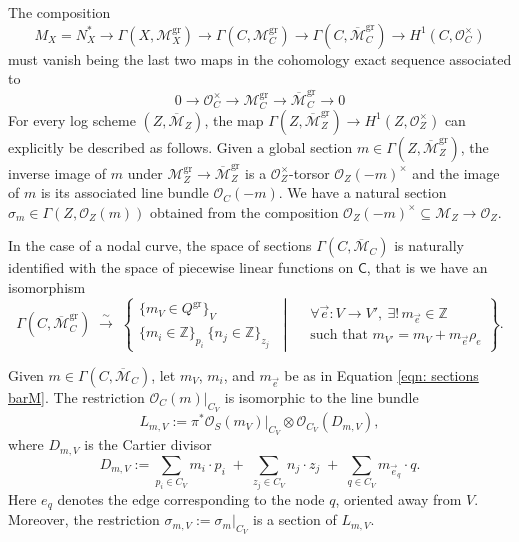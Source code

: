 \documentclass{article}
\def\cM{{\overline{\mathcal{M}}}}
\def\cO{\mathcal{O}}
\def\oM{\overline{\mathcal{M}}}
\def\cM{{\mathcal{M}}}
\newcommand{\gr}{\mathrm{gr}}
\begin{document}
The composition 
\begin{equation}\label{eqn: map M to Pic}
M_X= N_X^* \to \Gamma(X, \mathcal{M}^{\gr}_X) \to \Gamma(C, \cM^{\gr}_{C}) \to \Gamma(C, \oM^{\gr}_{C}) \to H^1(C, \cO_C^{\times})
\end{equation}
must vanish being the last two maps in the cohomology exact sequence associated to 
$$
0 \to \cO_C^{\times} \to \cM^{\gr}_C \to \oM^{\gr}_C \to 0
$$
For every log scheme $(Z,\oM_Z)$, the map $\Gamma(Z, \oM^{\gr}_{Z}) \to H^1(Z, \cO_Z^{\times})$ can explicitly be described as follows. Given a global section $m \in \Gamma(Z, \oM^{\gr}_{Z}) $, the inverse image of $m$ under $\cM^{\gr}_Z \to \oM^{\gr}_Z$ is a $\cO_Z^{\times}$-torsor $\cO_Z(-m)^{\times}$ and the image of $m$ is its associated line bundle $\cO_C(-m)$. We have a natural section $\sigma_m \in \Gamma(Z,\cO_Z(m))$ obtained from the composition $\cO_Z(-m)^{\times} \subseteq \cM_Z \to \cO_Z$.

In the case of a nodal curve, the space of sections $\Gamma(C,\oM_C)$ is naturally identified with the space of piecewise linear functions on $\mathsf{C}$, that is we have an isomorphism
\begin{equation}\label{eqn: sections barM}
\Gamma(C, \oM_C^{\gr})
\;\xrightarrow{\sim}\;
\left\{
\begin{array}{c}
\{m_V \in Q^{\gr}\}_V \\
\{m_i \in \mathbb{Z}\}_{p_i} \ \{n_j \in \mathbb{Z}\}_{z_j}
\end{array}
\ \middle|\ 
\begin{aligned}
&\forall \vec{e}: V \to V',\ \exists!\, m_{\vec{e}} \in \mathbb{Z} \\
&\text{such that } m_{V'} = m_V + m_{\vec{e}} \rho_e
\end{aligned}
\right\}.
\end{equation}

Given $m \in \Gamma(C, \oM_C)$, let $m_V$, $m_i$, and $m_{\vec{e}}$ be as in Equation \eqref{eqn: sections barM}. The restriction $\mathcal{O}_C(m)|_{C_V}$ is isomorphic to the line bundle
\begin{equation}\label{eqn: line bdl LmV}
L_{m,V} := \pi^*\mathcal{O}_S(m_V)\big|_{C_V} \otimes \mathcal{O}_{C_V}(D_{m,V}),
\end{equation}
where $D_{m,V}$ is the Cartier divisor
\begin{equation}\label{eqn: divisor DmV}
D_{m,V} := \sum_{p_i \in C_V} m_i \cdot p_i \;+\; \sum_{z_j \in C_V} n_j \cdot z_j \;+\; \sum_{q \in C_V} m_{\vec{e}_q} \cdot q.
\end{equation}
Here $e_q$ denotes the edge corresponding to the node $q$, oriented away from $V$. Moreover, the restriction $\sigma_{m,V} := \sigma_m|_{C_V}$ is a section of $L_{m,V}$.
\end{document}
